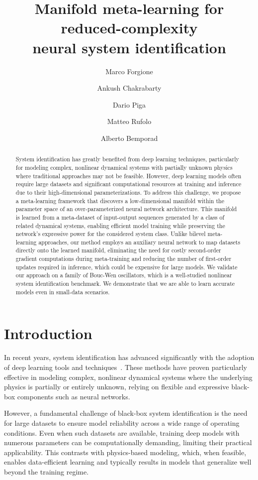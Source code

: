 \documentclass{article}
\title{Manifold meta-learning for reduced-complexity\\neural system identification}
\author[1]{Marco Forgione}
\author[2]{Ankush Chakrabarty}
\author[1]{Dario Piga}
\author[1]{Matteo Rufolo}
\author[3]{Alberto Bemporad}
\affil[1]{SUPSI, IDSIA - Dalle Molle Institute for Artificial Intelligence, Lugano, Switzerland.}
\affil[2]{Mitsubishi Electric Research Laboratories (MERL), Cambridge, MA, USA.}
\affil[3]{IMT School for Advanced Studies Lucca, Lucca, Italy.}
\begin{document}


\maketitle


\begin{abstract}
System identification has greatly benefited from deep learning techniques, particularly for modeling complex, nonlinear dynamical systems with partially unknown physics where traditional approaches may not be feasible. However, deep learning models often require large datasets and significant computational resources at training and inference due to their high-dimensional parameterizations.
To address this challenge, we propose a meta-learning framework that discovers a low-dimensional manifold within the parameter space of an over-parameterized neural network architecture. This manifold is learned from a meta-dataset of input-output sequences generated by a class of related dynamical systems, enabling efficient model training while preserving the network's expressive power for the considered system class. Unlike bilevel meta-learning approaches, our method employs an auxiliary neural network to map datasets directly onto the learned manifold, eliminating the need for costly second-order gradient computations during meta-training and reducing the number of first-order updates required in inference, which could be expensive for large models. We validate our approach on a family of Bouc-Wen oscillators, which is a well-studied nonlinear system identification benchmark. We demonstrate that we are able to learn accurate models  even in small-data scenarios.
\end{abstract}

\section{Introduction}
In recent years, system identification has advanced significantly with the adoption of deep learning tools and techniques~\cite{forgione2021continuous, Bem25, deshpande2023physics, champneys2024baseline}. These methods have proven particularly effective in modeling complex, nonlinear dynamical systems where the underlying physics is partially or entirely unknown, relying on flexible and expressive black-box components such as neural networks.

However, a fundamental challenge of black-box system identification is the need for large datasets to ensure model reliability across a wide range of operating conditions. Even when such datasets are available, training deep models with numerous parameters can be computationally demanding, limiting their practical applicability. This contrasts with physics-based modeling, which, when feasible, enables data-efficient learning and typically results in models that generalize well beyond the training regime.
\end{document}
